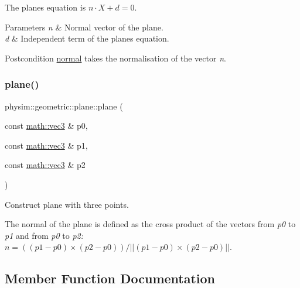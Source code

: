 The plane\textquotesingle{}s equation is $ n \cdot X + d = 0$. 
\begin{DoxyParams}{Parameters}
{\em n} & Normal vector of the plane. \\
\hline
{\em d} & Independent term of the plane\textquotesingle{}s equation. \\
\hline
\end{DoxyParams}
\begin{DoxyPostcond}{Postcondition}
\hyperlink{classphysim_1_1geometric_1_1plane_a373cd794f689cf83458f6c6f051b59d9}{normal} takes the normalisation of the vector {\itshape n}. 
\end{DoxyPostcond}
\mbox{\label{classphysim_1_1geometric_1_1plane_a5d793dd111e0b7c83c7e11b47c037637}} 
\subsubsection{\texorpdfstring{plane()}{plane()}\hspace{0.1cm}{\footnotesize\ttfamily [3/3]}}
{\footnotesize\ttfamily physim\+::geometric\+::plane\+::plane (\begin{DoxyParamCaption}\item[{const \hyperlink{structphysim_1_1math_1_1vec3}{math\+::vec3} \&}]{p0,  }\item[{const \hyperlink{structphysim_1_1math_1_1vec3}{math\+::vec3} \&}]{p1,  }\item[{const \hyperlink{structphysim_1_1math_1_1vec3}{math\+::vec3} \&}]{p2 }\end{DoxyParamCaption})}



Construct plane with three points. 

The normal of the plane is defined as the cross product of the vectors from {\itshape p0} to {\itshape p1} and from {\itshape p0} to {\itshape p2\+:} $n = ( (p1 - p0) \times (p2 - p0) )/||(p1 - p0) \times (p2 - p0)|| $. 

\subsection{Member Function Documentation}
\mbox{\label{classphysim_1_1geometric_1_1plane_ac936ee12c58bf474238f76bb1ad64c2c}} 
